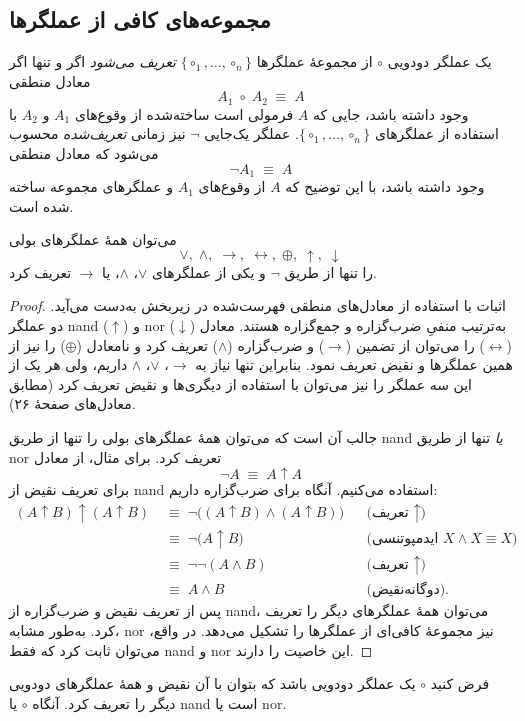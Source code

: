 \subsection*{ مجموعه‌های کافی از عملگرها}
    \begin{definition}[تعریف \lr{2.35}]
      یک عملگر دودویی $\circ$ از مجموعهٔ عملگرها $\{\circ_1,\dots,\circ_n\}$ \emph{تعریف می‌شود} اگر و تنها اگر معادل منطقی
      \[
      A_1 \;\circ\; A_2 \;\equiv\; A
      \]
      وجود داشته باشد، جایی که $A$ فرمولی است ساخته‌شده از وقوع‌های $A_1$ و $A_2$ با استفاده از عملگرهای $\{\circ_1,\dots,\circ_n\}$.  
      عملگر یک‌جایی $\neg$ نیز زمانی \emph{تعریف‌شده} محسوب می‌شود که معادل منطقی
      \[
      \neg A_1 \;\equiv\; A
      \]
      وجود داشته باشد، با این توضیح که $A$ از وقوع‌های $A_1$ و عملگرهای مجموعه ساخته شده است.
    \end{definition}
    \begin{theorem}[قضیه \lr{2.36}]
      می‌توان همهٔ عملگرهای بولی 
      \[
      \lor,\;\land,\;\to,\;\leftrightarrow,\;\oplus,\;\uparrow,\;\downarrow
      \]
      را تنها از طریق $\neg$ و یکی از عملگرهای $\lor$، $\land$، یا $\to$ تعریف کرد.
    \end{theorem}
    \begin{proof}
      اثبات با استفاده از معادل‌های منطقی فهرست‌شده در زیربخش  به‌دست می‌آید.  
      دو عملگر nand ($\uparrow$) و nor ($\downarrow$) به‌ترتیب منفیِ ضرب‌گزاره و جمع‌گزاره هستند.  
      معادل ($\leftrightarrow$) را می‌توان از تضمین ($\to$) و ضرب‌گزاره ($\land$) تعریف کرد و نامعادل ($\oplus$) را نیز از همین عملگرها و نقیض تعریف نمود.  
      بنابراین تنها نیاز به $\to$، $\lor$، $\land$ داریم، ولی هر یک از این سه عملگر را نیز می‌توان با استفاده از دیگری‌ها و نقیض تعریف کرد (مطابق معادل‌های صفحهٔ ۲۶).
      
      جالب آن است که می‌توان همهٔ عملگرهای بولی را تنها از طریق nand \emph{یا} تنها از طریق nor تعریف کرد. برای مثال، از معادل
      \[
      \neg A \;\equiv\; A \uparrow A
      \]
      برای تعریف نقیض از nand استفاده می‌کنیم. آنگاه برای ضرب‌گزاره داریم:
      \[
      \begin{aligned}
      (A \uparrow B) \uparrow (A \uparrow B)
      &\;\equiv\;
      \neg\bigl((A \uparrow B)\land(A \uparrow B)\bigr)
      &&\text{(تعریف \(\uparrow\))}\\
      &\;\equiv\;
      \neg\bigl(A \uparrow B\bigr)
      &&\text{(ایدمپوتنسی \(X\land X\equiv X\))}\\
      &\;\equiv\;
      \neg\neg(A\land B)
      &&\text{(تعریف \(\uparrow\))}\\
      &\;\equiv\;
      A\land B
      &&\text{(دوگانه‌نقیض)}.
    \end{aligned}
    \]
    پس از تعریف نقیض و ضرب‌گزاره از nand، می‌توان همهٔ عملگرهای دیگر را تعریف کرد. به‌طور مشابه، nor نیز مجموعهٔ کافی‌ای از عملگرها را تشکیل می‌دهد.  
    در واقع، می‌توان ثابت کرد که فقط nand و nor این خاصیت را دارند.
    \end{proof}
    \begin{theorem}[قضیه \lr{2.37}]
      فرض کنید $\circ$ یک عملگر دودویی باشد که بتوان با آن نقیض و همهٔ عملگرهای دودویی دیگر را تعریف کرد. آنگاه $\circ$ یا nand است یا nor.
    \end{theorem}
